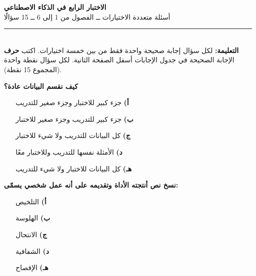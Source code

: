 \documentclass[11pt,a4paper]{article}
\begin{document}
\begin{center}
{\Large\khatt\textbf{الاختبار الرابع في الذكاء الاصطناعي}}\\[2pt]
{\normalsize أسئلة متعددة الاختيارات ــ الفصول من 1 إلى 6 ــ 15 سؤالًا}
\end{center}
\vspace{-4pt}\rule{\textwidth}{0.6pt}\\
{\small\textbf{التعليمة:} لكل سؤال إجابة صحيحة واحدة فقط من بين خمسة اختيارات.
اكتب \textbf{حرف} الإجابة الصحيحة في جدول الإجابات أسفل الصفحة الثانية.
لكل سؤال نقطة واحدة (المجموع 15 نقطة).}
\vspace{-2pt}
\begin{multicols}{2}

\noindent\begin{minipage}{\linewidth}
\hangindent=0.7cm\textbf{كيف نقسم البيانات عادة؟}
\begin{itemize}[leftmargin=0.95cm, labelsep=4pt, itemsep=0pt, topsep=2pt, parsep=0pt]
  \item[\textbf{أ)}] جزء كبير للاختبار وجزء صغير للتدريب
  \item[\textbf{ب)}] جزء كبير للتدريب وجزء صغير للاختبار
  \item[\textbf{ج)}] كل البيانات للتدريب ولا شيء للاختبار
  \item[\textbf{د)}] الأمثلة نفسها للتدريب وللاختبار معًا
  \item[\textbf{هـ)}] كل البيانات للاختبار ولا شيء للتدريب
\end{itemize}
\end{minipage}\par\vspace{7pt plus 4pt}
\noindent\begin{minipage}{\linewidth}
\hangindent=0.7cm\textbf{نسخ نص أنتجته الأداة وتقديمه على أنه عمل شخصي يسمّى:}
\begin{itemize}[leftmargin=0.95cm, labelsep=4pt, itemsep=0pt, topsep=2pt, parsep=0pt]
  \item[\textbf{أ)}] التلخيص
  \item[\textbf{ب)}] الهلوسة
  \item[\textbf{ج)}] الانتحال
  \item[\textbf{د)}] الشفافية
  \item[\textbf{هـ)}] الإفصاح
\end{itemize}
\end{minipage}\par\vspace{7pt plus 4pt}

\end{multicols}
\end{document}
